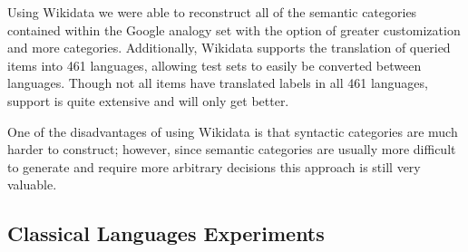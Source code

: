 \documentclass[11pt,a4paper]{article}
\begin{document}
Using Wikidata we were able to reconstruct all of the semantic categories contained within the Google analogy set with the option of greater customization and more categories.
 Additionally, Wikidata supports the translation of queried items into 461 languages, allowing test sets to easily be converted between languages.
  Though not all items have translated labels in all 461 languages, support is quite extensive and will only get better. 

One of the disadvantages of using Wikidata is that syntactic categories are much harder to construct;
 however, since semantic categories are usually more difficult to generate 
 and require more arbitrary decisions this approach is still very valuable.

\subsection{Classical Languages Experiments}
\end{document}
